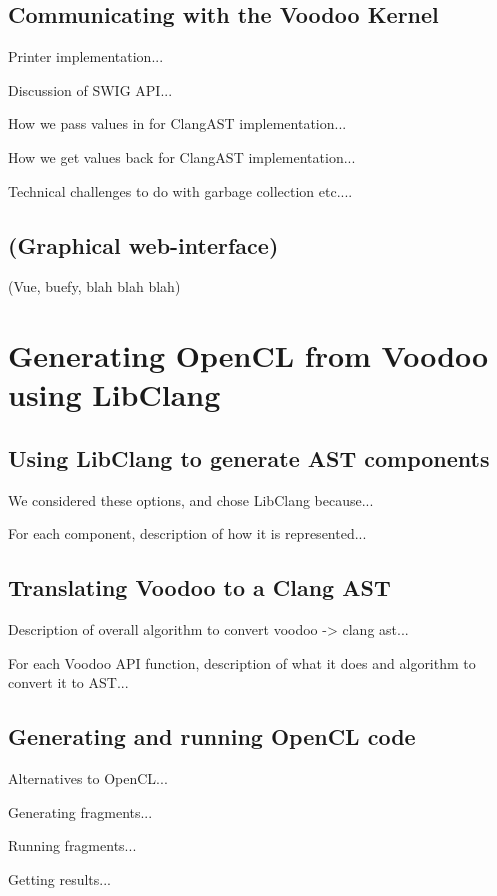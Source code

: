 \subsection{Communicating with the Voodoo Kernel}

Printer implementation...

Discussion of SWIG API...

How we pass values in for ClangAST implementation...

How we get values back for ClangAST implementation...

Technical challenges to do with garbage collection etc....

\subsection{(Graphical web-interface)}

(Vue, buefy, blah blah blah)

\section{Generating OpenCL from Voodoo using LibClang}

\subsection{Using LibClang to generate AST components}

We considered these options, and chose LibClang because...

For each component, description of how it is represented...

\subsection{Translating Voodoo to a Clang AST}

Description of overall algorithm to convert voodoo -> clang ast...

For each Voodoo API function, description of what it does and algorithm to convert it to AST...

\subsection{Generating and running OpenCL code}

Alternatives to OpenCL...

Generating fragments...

Running fragments...

Getting results...

